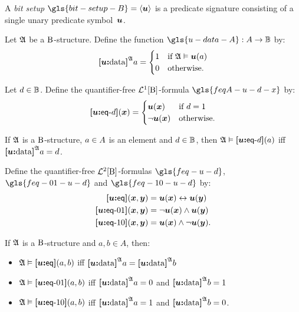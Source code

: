 A \emph{bit setup} $\gls{bit-setup-B} = \seq{\su}$ is a predicate signature
consisting of a single unary predicate symbol~$\su$.

\begin{definition}
Let $\StrA$ be a $\BS$-structure.
Define the function $\gls{u-data-A} : \domA \to \Bits$ by:
\[
  \data\su\StrA a = \begin{cases}
    1 &\text{if } \StrA \vDash \su(a) \\
    0 &\text{otherwise.}
  \end{cases}
\]
\end{definition}
\begin{definition}
Let $\datad \in \Bits$. Define the quantifier-free $\vFoF1\BS$-formula
$\gls{feqA-u-d-x}$ by:
\[
  \feqA\su\datad(\xx) = \begin{cases}
    \su(\xx) &\text{if } \datad = 1 \\
    \lnot\su(\xx) &\text{otherwise.}
  \end{cases}
\]
\end{definition}

\begin{remark}
If $\StrA$ is a $\BS$-structure, $\ea\in\domA$ is an element and $\datad \in
\Bits$, then $\StrA \vDash \feqA\su\datad(\ea)$ iff $\data\su\StrA\ea = \datad$.
\end{remark}

\begin{definition}
Define the quantifier-free $\vFoF2\BS$-formulas 
$\gls{feq-u-d}$, $\gls{feq-01-u-d}$ and $\gls{feq-10-u-d}$ by:
\begin{align*}
  \feq\su(\xx,\yy) &= \su(\xx) \lequ \su(\yy) \\
  \feqOI\su(\xx,\yy) &= \lnot \su(\xx) \land \su(\yy) \\
  \feqIO\su(\xx,\yy) &= \su(\xx) \land \lnot \su(\yy). \\
\end{align*}
\end{definition}

\begin{remark}
If $\StrA$ is a $\BS$-structure and $a, b \in A$, then:
\begin{itemize}
  \item $\StrA \vDash \feq\su(a, b)$ iff $\data\su\StrA a = \data\su\StrA b$
  \item $\StrA \vDash \feqOI\su(a, b)$ iff $\data\su\StrA a = 0$ and
  $\data\su\StrA b = 1$
  \item $\StrA \vDash \feqIO\su(a, b)$ iff $\data\su\StrA a = 1$ and
  $\data\su\StrA b = 0$.
\end{itemize}
\end{remark}